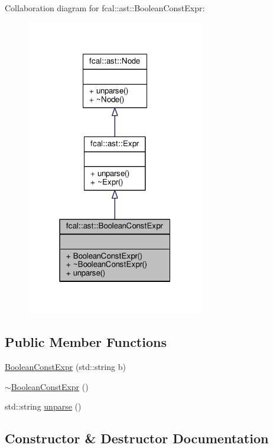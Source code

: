 Collaboration diagram for fcal\+:\+:ast\+:\+:Boolean\+Const\+Expr\+:
\nopagebreak
\begin{figure}[H]
\begin{center}
\leavevmode
\includegraphics[width=220pt]{classfcal_1_1ast_1_1BooleanConstExpr__coll__graph}
\end{center}
\end{figure}
\subsection*{Public Member Functions}
\begin{DoxyCompactItemize}
\item 
\hyperlink{classfcal_1_1ast_1_1BooleanConstExpr_a456ff1929e3cf2e21d19c53d9f06bec9}{Boolean\+Const\+Expr} (std\+::string b)
\item 
\hyperlink{classfcal_1_1ast_1_1BooleanConstExpr_a7e0f518f983a98f986c7ee2206972400}{$\sim$\+Boolean\+Const\+Expr} ()
\item 
std\+::string \hyperlink{classfcal_1_1ast_1_1BooleanConstExpr_a24fbd101f0aa59fc7379b2365f4f84be}{unparse} ()
\end{DoxyCompactItemize}


\subsection{Constructor \& Destructor Documentation}
